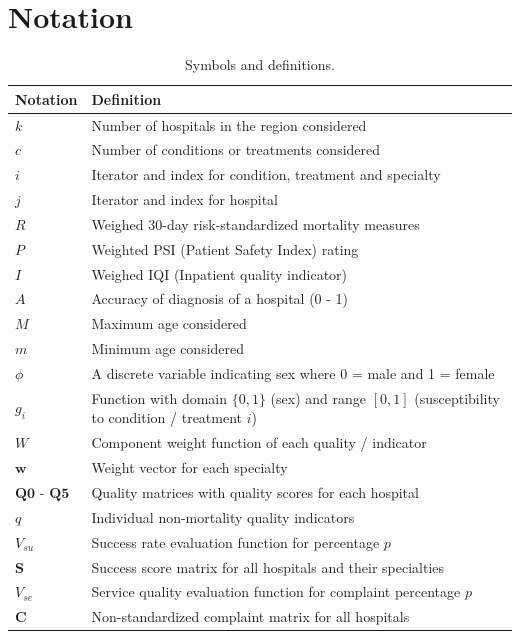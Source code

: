 \documentclass{article}
\begin{document}
\section{Notation}
{\renewcommand{\arraystretch}{1.3}%
\begin{center}
    \begin{longtable}{l| l{500pt}}
      \caption{Symbols and definitions.}\\
        Notation & Definition \\
        \hline
        $k$ & Number of hospitals in the region considered \\
        $c$ & Number of conditions or treatments considered\\
        $i$ & Iterator and index for condition, treatment and specialty\\
        $j$ & Iterator and index for hospital\\
        $R$ & Weighed 30-day risk-standardized mortality measures\\
        $P$ & Weighted PSI (Patient Safety Index) rating\\
        $I$ & Weighed IQI (Inpatient quality indicator)\\
        $A$ & Accuracy of diagnosis of a hospital (0 - 1)\\
        $M$ & Maximum age considered\\
        $m$ & Minimum age considered\\
        $\phi$ & A discrete variable indicating sex where 0 = male and 1 = female \\
        $g_i$ & Function with domain $\{0,1\}$ (sex) and range $[0,1]$ (susceptibility to condition / treatment $i$)\\
        $W$ & Component weight function of each quality / indicator\\
        $\mathbf{w}$ & Weight vector for each specialty \\
        $\mathbf{Q0}$ - $\mathbf{Q5}$ & Quality matrices with quality scores for each hospital\\
        $q$ & Individual non-mortality quality indicators\\
        $V_{su}$ & Success rate evaluation function for percentage $p$\\
        $\mathbf{S}$ & Success score matrix for all hospitals and their specialties\\
        $V_{se}$ & Service quality evaluation function for complaint percentage $p$\\
        $\mathbf{C}$ & Non-standardized complaint matrix for all hospitals\\

\end{longtable}
\end{center}}
\end{document}
